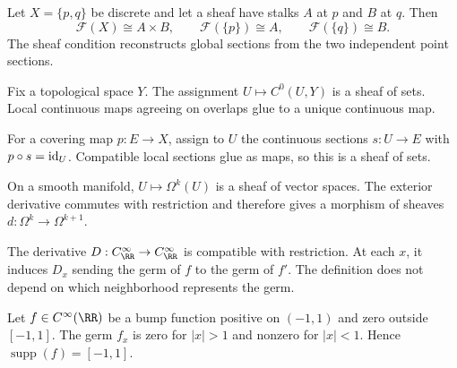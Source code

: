 \begin{example}
Let $X=\{p,q\}$ be discrete and let a sheaf have stalks $A$ at $p$ and $B$ at $q$.  Then
\[
\mathcal F(X)\cong A\times B,
\qquad
\mathcal F(\{p\})\cong A,
\qquad
\mathcal F(\{q\})\cong B.
\]
The sheaf condition reconstructs global sections from the two independent point sections.
\end{example}

\begin{example}
Fix a topological space $Y$.  The assignment $U\mapsto C^0(U,Y)$ is a sheaf of sets.  Local
continuous maps agreeing on overlaps glue to a unique continuous map.
\end{example}

\begin{example}
For a covering map $p:E\to X$, assign to $U$ the continuous sections $s:U\to E$ with
$p\circ s=\operatorname{id}_U$.  Compatible local sections glue as maps, so this is a sheaf of sets.
\end{example}

\begin{example}
On a smooth manifold, $U\mapsto\Omega^k(U)$ is a sheaf of vector spaces.  The exterior
derivative commutes with restriction and therefore gives a morphism of sheaves
$d:\Omega^k\to\Omega^{k+1}$.
\end{example}

\begin{example}
The derivative $D:C^\infty_\RR\to C^\infty_\RR$ is compatible with restriction.  At each
$x$, it induces $D_x$ sending the germ of $f$ to the germ of $f'$.  The definition does not
depend on which neighborhood represents the germ.
\end{example}

\begin{example}
Let $f\in C^\infty(\RR)$ be a bump function positive on $(-1,1)$ and zero outside
$[-1,1]$.  The germ $f_x$ is zero for $|x|>1$ and nonzero for $|x|<1$.  Hence
$\operatorname{supp}(f)=[-1,1]$.
\end{example}
